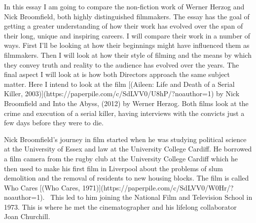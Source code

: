 \documentclass{article}
\begin{document}
In this essay I am going to compare the non-fiction work of Werner Herzog and Nick Broomfield, both highly distinguished filmmakers. The essay has the goal of getting a greater understanding of how their work has evolved over the span of their long, unique and inspiring careers. I will compare their work in a number of ways. First I'll be looking at how their beginnings might have influenced them as filmmakers. Then I will look at how their style of filming and the means by which they convey truth and reality to the audience has evolved over the years. The final aspect I will look at is how both Directors approach the same subject matter. Here I intend to look at the film [(Aileen: Life and Death of a Serial Killer, 2003)](https://paperpile.com/c/SdLVV0/U8hP/?noauthor=1) by Nick Broomfield and Into the Abyss, (2012) by Werner Herzog. Both films look at the crime and execution of a serial killer, having interviews with the convicts just a few days before they were to die.

Nick Broomfield's journey in film started when he was studying political science at the University of Essex and law at the University College Cardiff. He borrowed a film camera from the rugby club at the University College Cardiff which he then used to make his first film in Liverpool about the problems of slum demolition and the removal of residents to new housing blocks. The film is called Who Cares [(Who Cares, 1971)](https://paperpile.com/c/SdLVV0/W0Hr/?noauthor=1).  This led to him joining the National Film and Television School in 1973. This is where he met the cinematographer and his lifelong collaborator Joan Churchill.
\end{document}
